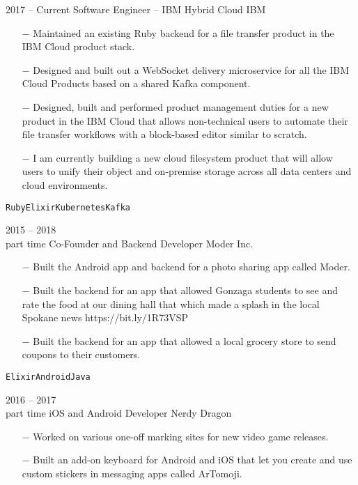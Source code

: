 \documentclass[9pt]{developercv} %
\begin{document}
\begin{entrylist}
	\entry
		{2017 -- Current}
		{Software Engineer \textnormal{-- IBM Hybrid Cloud}}
		{IBM}
		{
			\vspace*{-\baselineskip}
			\begin{itemize}
				\item[$-$] Maintained an existing Ruby backend for a file transfer product in the IBM Cloud product stack.
				\item[$-$] Designed and built out a WebSocket delivery microservice for all the IBM Cloud Products based on a shared Kafka component. 
				\item[$-$] Designed, built and performed product management duties for a new product in the IBM Cloud that allows non-technical users to automate their file transfer workflows with a block-based editor similar to scratch.
				\item[$-$] I am currently building a new cloud filesystem product that will allow users to unify their object and on-premise storage across all data centers and cloud environments.
			\end{itemize}
			\texttt{Ruby}\slashsep\texttt{Elixir}\slashsep\texttt{Kubernetes}\slashsep\texttt{Kafka}}
	\entry
		{2015 -- 2018\\\footnotesize{part time}}
		{Co-Founder and Backend Developer}
		{Moder Inc.}
		{
			\vspace*{-\baselineskip}
			\begin{itemize}
				\item[$-$] Built the Android app and backend for a photo sharing app called Moder.
				\item[$-$] Built the backend for an app that allowed Gonzaga students to see and rate the food at our dining hall that which made a splash in the local Spokane news https://bit.ly/1R73VSP
				\item[$-$] Built the backend for an app that allowed a local grocery store to send coupons to their customers.
			\end{itemize}
			\texttt{Elixir}\slashsep\texttt{Android}\slashsep\texttt{Java}}
	\entry
		{2016 -- 2017\\\footnotesize{part time}}
		{iOS and Android Developer}
		{Nerdy Dragon}
		{
			\vspace*{-\baselineskip}
			\begin{itemize}
				\item[$-$] Worked on various one-off marking sites for new video game releases.
				\item[$-$] Built an add-on keyboard for Android and iOS that let you create and use custom stickers in messaging apps called ArTomoji.

\end{itemize}}
\end{entrylist}
\end{document}
